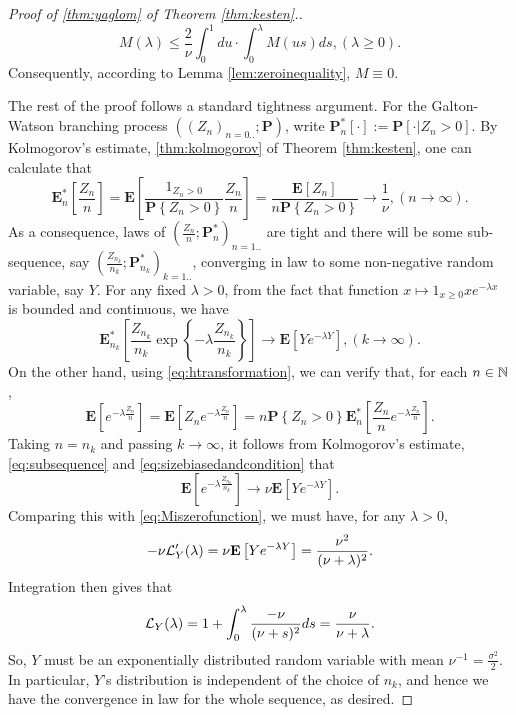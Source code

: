 \documentclass[12pt]{amsart}
\theoremstyle{remark}
\numberwithin{equation}{section}
\newcommand{\prob}{\mathbf P}
\newcommand{\brac}[1]{\left[ #1 \right]}
\newcommand{\set}[1]{\left\{ #1 \right\}}
\newcommand{\expct}{\mathbf E}
\begin{document}
\begin{proof}[Proof of \eqref{thm:yaglom} of Theorem \ref{thm:kesten}.]
\begin{equation*}
	    M(\lambda)
    \leq 
        \frac{2}{\nu}\int_0^1du
    \cdot
        \int_0^\lambda M(us)ds
    ,(\lambda\geq 0).
\end{equation*}
	Consequently, according to Lemma \ref{lem:zeroinequality}, $M\equiv 0$.
\par
	The rest of the proof follows a standard tightness argument. For the Galton-Watson branching process $((Z_n)_{n=0..};\prob)$, write $\prob_n^*[\cdot]:=\prob[\cdot|Z_n>0]$. By Kolmogorov's estimate, \eqref{thm:kolmogorov} of Theorem \ref{thm:kesten}, one can calculate that
\begin{equation*}
	    \expct_n^*\brac{\frac{Z_n}{n}}
	=
	    \expct\brac{\frac{1_{Z_n>0}}{\prob\set{Z_n>0}}\frac{Z_n}{n}}
	=
	    \frac{\expct\brac{Z_n}}{n\prob\set{Z_n>0}}
    \to
        \frac{1}{\nu}
    ,(n\to\infty).  
\end{equation*}
	As a consequence, laws of $(\frac{Z_n}{n};\prob_n^*)_{n=1..}$ are tight and there will be some sub-sequence, say $(\frac{Z_{n_k}}{n_k};\prob_{n_k}^*)_{k=1..}$, converging in law to some non-negative random variable, say $Y$. For any fixed $\lambda >0$, from the fact that function $x\mapsto 1_{x\geq 0}xe^{-\lambda x}$ is bounded and continuous, we have
\begin{equation}
\label{eq:subsequence}
	    \expct_{n_k}^*\brac{\frac{Z_{n_k}}{n_k}\exp\set{-\lambda\frac{Z_{n_k}}{n_k}}}
	\to
	    \expct\brac{Ye^{-\lambda Y}},
	(k\to\infty).
\end{equation}
	On the other hand, using \eqref{eq:htransformation}, we can verify that, for each $n\in\mathbb N$,
\begin{equation}
\label{eq:sizebiasedandcondition}
	    \expct\brac{e^{-\lambda\frac{\dot Z_n}{n}}}
	=
	    \expct\brac{Z_n e^{-\lambda\frac{Z_n}{n}}}
	=
	    n\prob\set{Z_n>0}\expct_n^*\brac{\frac{Z_n}{n}e^{-\lambda\frac{Z_n}{n}}}.   
\end{equation}
	Taking $n=n_k$ and passing $k\to\infty$, it follows from Kolmogorov's estimate, \eqref{eq:subsequence} and \eqref{eq:sizebiasedandcondition} that
\begin{equation*}
	    \expct\brac{e^{-\lambda\frac{\dot Z_{n_k}}{n_k}}}
	\to
	    \nu\expct\brac{Ye^{-\lambda Y}}.
\end{equation*}
	Comparing this with \eqref{eq:Miszerofunction}, we must have, for any $\lambda >0$,
\begin{equation*}
	    -\nu\cL_Y'(\lambda)
	=
	    \nu\expct\brac{Ye^{-\lambda Y}}
    =	
	    \frac{\nu^2}{(\nu+\lambda)^2}.
\end{equation*}
	Integration then gives that
\begin{equation*}
	    \mathcal L_Y(\lambda)
	=
	    1
	+
	    \int_0^\lambda\frac{-\nu}{(\nu+s)^2}ds
	=
	    \frac{\nu}{\nu+\lambda}. 
\end{equation*}
	So, $Y$ must be an exponentially distributed random variable with mean $\nu^{-1}=\frac{\sigma^2}{2}$. In particular, $Y$'s distribution is independent of the choice of $n_k$, and hence we have the convergence in law for the whole sequence, as desired.
\end{proof}


\end{document}
